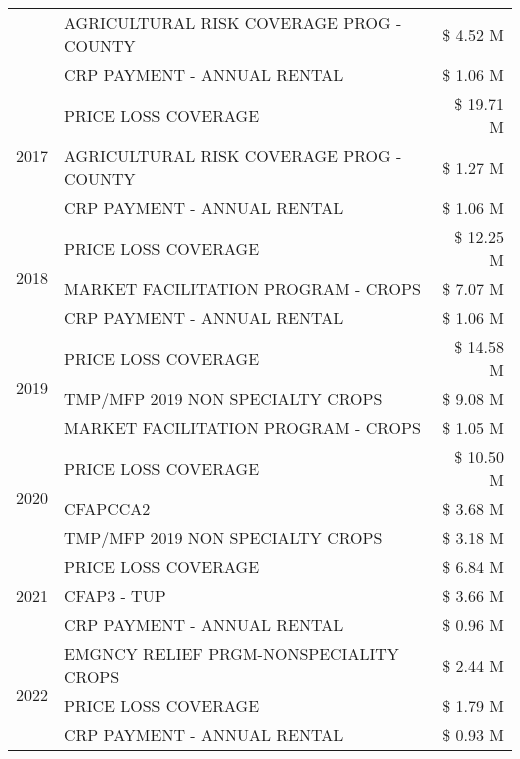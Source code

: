 \begin{tabular}{llr}
 & AGRICULTURAL RISK COVERAGE PROG - COUNTY & \$ 4.52 M \\
 & CRP PAYMENT - ANNUAL RENTAL & \$ 1.06 M \\
\cline{1-3}
\multirow[t]{3}{*}{2017} & PRICE LOSS COVERAGE & \$ 19.71 M \\
 & AGRICULTURAL RISK COVERAGE PROG - COUNTY & \$ 1.27 M \\
 & CRP PAYMENT - ANNUAL RENTAL & \$ 1.06 M \\
\cline{1-3}
\multirow[t]{3}{*}{2018} & PRICE LOSS COVERAGE & \$ 12.25 M \\
 & MARKET FACILITATION PROGRAM - CROPS & \$ 7.07 M \\
 & CRP PAYMENT - ANNUAL RENTAL & \$ 1.06 M \\
\cline{1-3}
\multirow[t]{3}{*}{2019} & PRICE LOSS COVERAGE & \$ 14.58 M \\
 & TMP/MFP 2019 NON SPECIALTY CROPS & \$ 9.08 M \\
 & MARKET FACILITATION PROGRAM - CROPS & \$ 1.05 M \\
\cline{1-3}
\multirow[t]{3}{*}{2020} & PRICE LOSS COVERAGE & \$ 10.50 M \\
 & CFAPCCA2 & \$ 3.68 M \\
 & TMP/MFP 2019 NON SPECIALTY CROPS & \$ 3.18 M \\
\cline{1-3}
\multirow[t]{3}{*}{2021} & PRICE LOSS COVERAGE & \$ 6.84 M \\
 & CFAP3 - TUP & \$ 3.66 M \\
 & CRP PAYMENT - ANNUAL RENTAL & \$ 0.96 M \\
\cline{1-3}
\multirow[t]{3}{*}{2022} & EMGNCY RELIEF PRGM-NONSPECIALITY CROPS & \$ 2.44 M \\
 & PRICE LOSS COVERAGE & \$ 1.79 M \\
 & CRP PAYMENT - ANNUAL RENTAL & \$ 0.93 M \\
\cline{1-3}
\bottomrule
\end{tabular}

